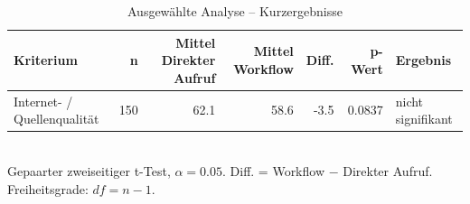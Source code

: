 \begin{table}[htbp]
\centering
\caption{Ausgewählte Analyse -- Kurzergebnisse}
\begin{tabular}{lrrrrrl}
\toprule
Kriterium & n & Mittel Direkter Aufruf & Mittel Workflow & Diff. & p-Wert & Ergebnis \\
\midrule
Internet- / Quellenqualität & 150 & 62.1 & 58.6 & -3.5 & 0.0837 & nicht signifikant \\
\bottomrule
\end{tabular}
\\[2mm]
\footnotesize Gepaarter zweiseitiger t-Test, $\alpha=0.05$. Diff. = Workflow $-$ Direkter Aufruf. Freiheitsgrade: $df=n-1$.
\end{table}

